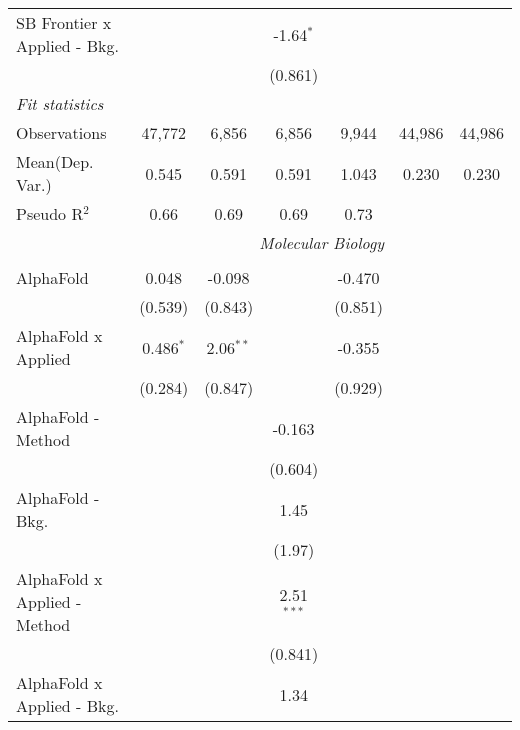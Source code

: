 \begin{tabular}{lcccccc}
   SB Frontier x Applied - Bkg.   &               &              & -1.64$^{*}$  &               &        &   \\   
                                  &               &              & (0.861)      &               &        &   \\   
   \midrule
   \emph{Fit statistics}\\
   Observations                   & 47,772        & 6,856        & 6,856        & 9,944         & 44,986 & 44,986\\  
Mean(Dep. Var.) & 0.545 & 0.591 & 0.591 & 1.043 & 0.230 & 0.230 \\
   Pseudo R$^2$                   & 0.66          & 0.69         & 0.69         & 0.73          &        & \\  
   
 & \multicolumn{6}{c}{\textit{Molecular Biology}} \\ \\
   AlphaFold                      & 0.048        & -0.098        &               & -0.470  &        &   \\   
                                  & (0.539)      & (0.843)       &               & (0.851) &        &   \\   
   AlphaFold x Applied            & 0.486$^{*}$  & 2.06$^{**}$   &               & -0.355  &        &   \\   
                                  & (0.284)      & (0.847)       &               & (0.929) &        &   \\   
   AlphaFold - Method             &              &               & -0.163        &         &        &   \\   
                                  &              &               & (0.604)       &         &        &   \\   
   AlphaFold - Bkg.               &              &               & 1.45          &         &        &   \\   
                                  &              &               & (1.97)        &         &        &   \\   
   AlphaFold x Applied - Method   &              &               & 2.51$^{***}$  &         &        &   \\   
                                  &              &               & (0.841)       &         &        &   \\   
   AlphaFold x Applied - Bkg.     &              &               & 1.34          &         &        &   \\   

\end{tabular}
